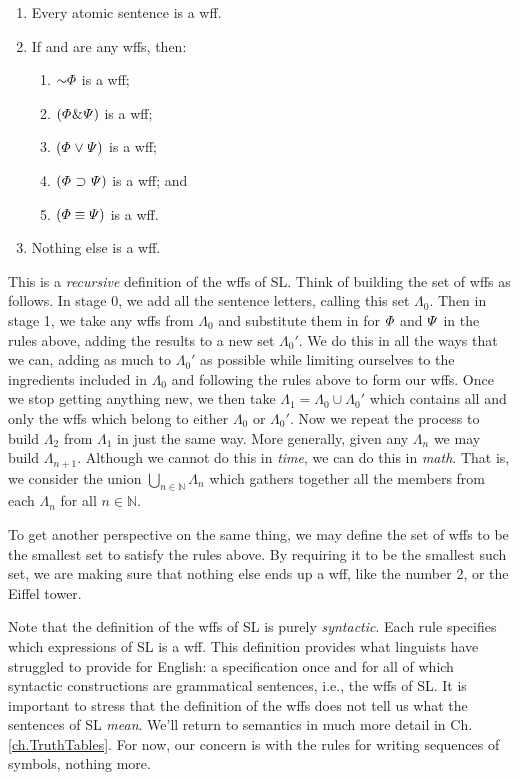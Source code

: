 \begin{enumerate}
\item Every atomic sentence is a wff.
\item If \metaA{} and \metaB{} are any wffs, then:
	\begin{enumerate}
		\item $\enot\metaA{}$ is a wff;
		\item $(\varPhi{}\mkern1mu\&\mkern1mu\varPsi{})$ is a wff;
		\item $(\varPhi{}\mkern1mu\vee\mkern1mu\varPsi{})$ is a wff;
		\item $(\varPhi{}\mkern1mu\supset\mkern1mu\varPsi{})$ is a wff; and
		\item $(\varPhi{}\equiv\varPsi{})$ is a wff.
	\end{enumerate}
\item Nothing else is a wff.
\end{enumerate}

This is a \emph{recursive} definition of the wffs of SL.
Think of building the set of wffs as follows.
In stage 0, we add all the sentence letters, calling this set $\Lambda_0$.
Then in stage 1, we take any wffs from $\Lambda_0$ and substitute them in for $\varPhi{}$ and $\varPsi{}$ in the rules above, adding the results to a new set $\Lambda_0'$.
We do this in all the ways that we can, adding as much to $\Lambda_0'$ as possible while limiting ourselves to the ingredients included in $\Lambda_0$ and following the rules above to form our wffs. 
Once we stop getting anything new, we then take $\Lambda_1 = \Lambda_0 \cup \Lambda_0'$ which contains all and only the wffs which belong to either $\Lambda_0$ or $\Lambda_0'$.
Now we repeat the process to build $\Lambda_2$ from $\Lambda_1$ in just the same way.
More generally, given any $\Lambda_n$ we may build $\Lambda_{n+1}$.
Although we cannot do this in \textit{time}, we can do this in \textit{math}.
That is, we consider the union $\bigcup_{n\in \mathbb{N}}\Lambda_n$ which gathers together all the members from each $\Lambda_n$ for all $n \in \mathbb{N}$.

To get another perspective on the same thing, we may define the set of wffs to be the smallest set to satisfy the rules above.
By requiring it to be the smallest such set, we are making sure that nothing else ends up a wff, like the number 2, or the Eiffel tower. 

Note that the definition of the wffs of SL is purely \emph{syntactic}.
Each rule specifies which expressions of SL is a wff.
This definition provides what linguists have struggled to provide for English: a specification once and for all of which syntactic constructions are grammatical sentences, i.e., the wffs of SL.
It is important to stress that the definition of the wffs does not tell us what the sentences of SL \emph{mean}.
We'll return to semantics in much more detail in Ch. \ref{ch.TruthTables}.
For now, our concern is with the rules for writing sequences of symbols, nothing more.

